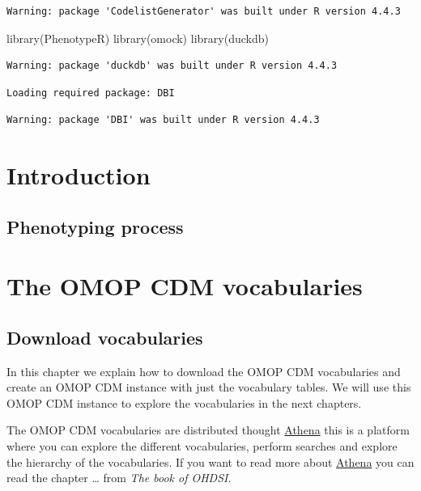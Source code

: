 \documentclass[
  letterpaper,
  oneside,
  open=any]{scrbook}
\newenvironment{Shaded}{\begin{snugshade}}{\end{snugshade}}
\newcommand{\FunctionTok}[1]{\textcolor[rgb]{0.28,0.35,0.67}{#1}}
\newcommand{\NormalTok}[1]{\textcolor[rgb]{0.00,0.23,0.31}{#1}}
\begin{document}
\begin{verbatim}
Warning: package 'CodelistGenerator' was built under R version 4.4.3
\end{verbatim}

\begin{Shaded}
\begin{Highlighting}[]
\FunctionTok{library}\NormalTok{(PhenotypeR)}
\FunctionTok{library}\NormalTok{(omock)}
\FunctionTok{library}\NormalTok{(duckdb)}
\end{Highlighting}
\end{Shaded}

\begin{verbatim}
Warning: package 'duckdb' was built under R version 4.4.3
\end{verbatim}

\begin{verbatim}
Loading required package: DBI
\end{verbatim}

\begin{verbatim}
Warning: package 'DBI' was built under R version 4.4.3
\end{verbatim}

\part{Introduction}

\chapter{Phenotyping process}\label{phenotyping-process}

\part{The OMOP CDM vocabularies}

\chapter{Download vocabularies}\label{download-vocabularies}

In this chapter we explain how to download the OMOP CDM vocabularies and
create an OMOP CDM instance with just the vocabulary tables. We will use
this OMOP CDM instance to explore the vocabularies in the next chapters.

The OMOP CDM vocabularies are distributed thought
\href{athena.ohdsi.org}{Athena} this is a platform where you can explore
the different vocabularies, perform searches and explore the hierarchy
of the vocabularies. If you want to read more about
\href{athena.ohdsi.org}{Athena} you can read the chapter \ldots{} from
\emph{The book of OHDSI}.
\end{document}
